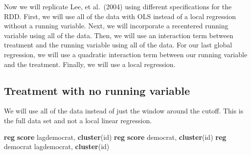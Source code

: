 \documentclass[
]{book}
\newenvironment{Shaded}{\begin{snugshade}}{\end{snugshade}}
\newcommand{\KeywordTok}[1]{\textcolor[rgb]{0.13,0.29,0.53}{\textbf{#1}}}
\newcommand{\NormalTok}[1]{#1}
\begin{document}
Now we will replicate Lee, et al.~(2004) using different specifications for the RDD. First, we will use all of the data with OLS instead of a local regression without a running variable. Next, we will incorporate a recentered running variable using all of the data. Then, we will use an interaction term between treatment and the running variable using all of the data. For our last global regression, we will use a quadratic interaction term between our running variable and the treatment. Finally, we will use a local regression.

\subsection{Treatment with no running variable}\label{treatment-with-no-running-variable}

We will use all of the data instead of just the window around the cutoff. This is the full data set and not a local linear regression.

\begin{Shaded}
\begin{Highlighting}[]
\KeywordTok{reg} \KeywordTok{score}\NormalTok{ lagdemocrat, }\KeywordTok{cluster}\NormalTok{(id)}
\KeywordTok{reg} \KeywordTok{score}\NormalTok{ democrat, }\KeywordTok{cluster}\NormalTok{(id)}
\KeywordTok{reg}\NormalTok{ democrat lagdemocrat, }\KeywordTok{cluster}\NormalTok{(id)}
\end{Highlighting}
\end{Shaded}
\end{document}
